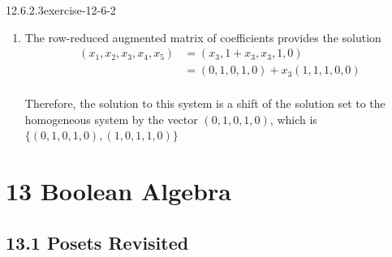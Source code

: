 \documentclass[twoside,10pt,]{book}
\numberwithin{equation}{section}
\begin{document}
\begin{divisionsolution}{12.6.2.3}{}{exercise-12-6-2}
\begin{enumerate}[label=(\alph*)]
\begin{equation*}
\begin{split}
(x_1, x_2, x_3, x_4, x_5)& =(x_3,x_3,x_3,0,0)\\
& = x_3 (1,1,1,0,0) \\
\end{split}
\end{equation*}
%
\par
\hypertarget{p-4751}{}%
The solution set has only two elements. It is \(\{(0,0,0,0,0), (1,1,1,0,0)\}\).  Since \(\mathbb{Z}_{2}^{5}\) is a finite group,  the solution set is a subgroup because it is closed with respect to coordinate-wise mod 2 addition.%
\item\hypertarget{li-2166}{}\hypertarget{p-4752}{}%
The row-reduced augmented matrix of coefficients provides the solution%
\begin{equation*}
\begin{split}
(x_1, x_2, x_3, x_4, x_5)& =(x_3,1+x_3,x_3,1,0)\\
& = (0,1,0,1,0) + x_3 (1,1,1,0,0) \\
\end{split}
\end{equation*}
%
\par
\hypertarget{p-4753}{}%
Therefore, the solution to this system is a shift of the solution set to the homogeneous system by the vector \((0,1,0,1,0)\), which is \(\{(0,1,0,1,0), (1,0,1,1,0)\}\)%
\end{enumerate}
%
\end{divisionsolution}%
\chapter*{13 Boolean Algebra}
\section*{13.1 Posets Revisited}
\end{document}

